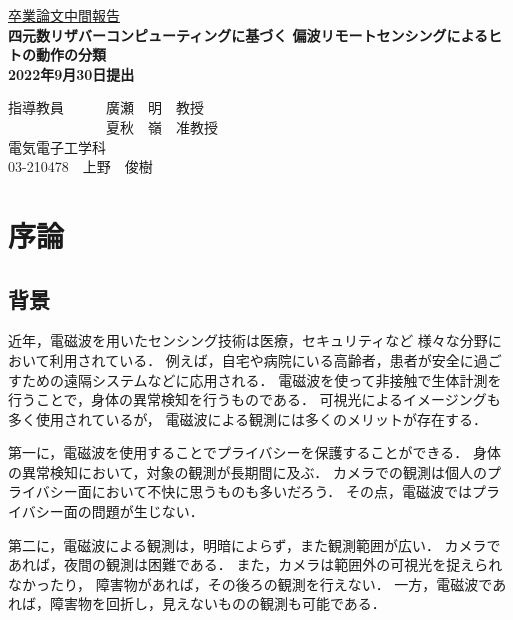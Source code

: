 \documentclass[uplatex,a4paper,10pt]{jsarticle}
\begin{document}
\begin{center}
\vspace*{3cm} \underline{\HUGE 卒業論文中間報告 }\\
\vspace{1cm}
\bf{ \Huge 四元数リザバーコンピューティングに基づく
偏波リモートセンシングによるヒトの動作の分類\\}
\vspace{3cm}
\huge 2022年9月30日提出 \\
\vspace{3cm}
\end{center}
\begin{minipage}{0.4\hsize}
\hspace{1zw}
\end{minipage}
\begin{center}
\begin{minipage}{0.7\hsize}
{\huge 指導教員　　　廣瀬　明　教授\\　　　　　　　夏秋　嶺　准教授}
\vspace{1cm}\\
\centering
{\huge 電気電子工学科\\}
{\huge 03-210478　上野　俊樹}
\end{minipage}
\end{center}


\newpage
\tableofcontents

\newpage 

\section{序論}
\subsection{背景}
近年，電磁波を用いたセンシング技術は医療，セキュリティなど
様々な分野において利用されている\cite{human_motion}．
例えば，自宅や病院にいる高齢者，患者が安全に過ごすための遠隔システムなどに応用される．
電磁波を使って非接触で生体計測を行うことで，身体の異常検知を行うものである．
可視光によるイメージングも多く使用されているが，
電磁波による観測には多くのメリットが存在する．

第一に，電磁波を使用することでプライバシーを保護することができる．
身体の異常検知において，対象の観測が長期間に及ぶ．
カメラでの観測は個人のプライバシー面において不快に思うものも多いだろう．
その点，電磁波ではプライバシー面の問題が生じない．

第二に，電磁波による観測は，明暗によらず，また観測範囲が広い．
カメラであれば，夜間の観測は困難である．
また，カメラは範囲外の可視光を捉えられなかったり，
障害物があれば，その後ろの観測を行えない．
一方，電磁波であれば，障害物を回折し，見えないものの観測も可能である．
\end{document}
